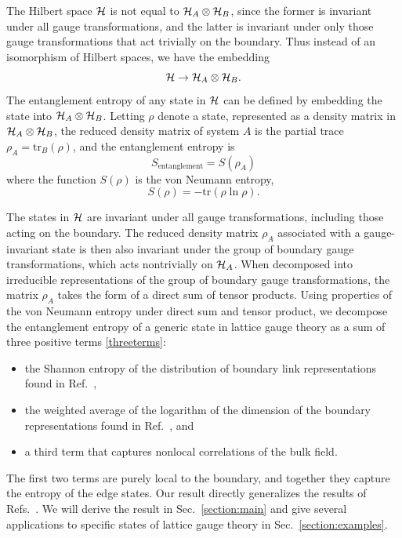 \documentclass[aps,prd,twocolumn,showpacs,groupedaddress,nofootinbib,letterpaper]{revtex4}
\begin{document}
The Hilbert space $\cal H$ is not equal to ${\cal H}_A \otimes {\cal H}_B$, since the former is invariant under all gauge transformations, and the latter is invariant under only those gauge transformations that act trivially on the boundary.
Thus instead of an isomorphism of Hilbert spaces, we have the embedding
\begin{equation} \label{embedding}
{\cal H} \to {\cal H}_A \otimes {\cal H}_B.
\end{equation}
The entanglement entropy of any state in $\cal H$ can be defined by embedding the state into ${\cal H}_A \otimes {\cal H}_B$.
Letting $\rho$ denote a state, represented as a density matrix in ${\cal H}_A \otimes {\cal H}_B$, the reduced density matrix of system $A$ is the partial trace $\rho_A = \text{tr}_B (\rho)$, and the entanglement entropy is
\begin{equation}
S_\text{entanglement} = S(\rho_A)
\end{equation}  
where the function $S(\rho)$ is the von Neumann entropy,
\begin{equation}
S(\rho) = - \text{tr} (\rho \ln \rho).
\end{equation}

The states in $\cal H$ are invariant under all gauge transformations, including those acting on the boundary.
The reduced density matrix $\rho_A$ associated with a gauge-invariant state is then also invariant under the group of boundary gauge transformations, which acts nontrivially on ${\cal H}_A$.
When decomposed into irreducible representations of the group of boundary gauge transformations, the matrix $\rho_A$ takes the form of a direct sum of tensor products.
Using properties of the von Neumann entropy under direct sum and tensor product, we decompose the entanglement entropy of a generic state in lattice gauge theory as a sum of three positive terms \eqref{threeterms}:
\begin{itemize}
\item the Shannon entropy of the distribution of boundary link representations found in Ref.~\cite{Buividovich2008b}, 
\item the weighted average of the logarithm of the dimension of the boundary representations found in Ref.~\cite{Donnelly2008}, and 
\item a third term that captures nonlocal correlations of the bulk field.
\end{itemize}
The first two terms are purely local to the boundary, and together they capture the entropy of the edge states.
Our result directly generalizes the results of Refs.~\cite{Buividovich2008b,Donnelly2008}.
We will derive the result in Sec.~\ref{section:main} and give several applications to specific states of lattice gauge theory in Sec.~\ref{section:examples}.
\end{document}
